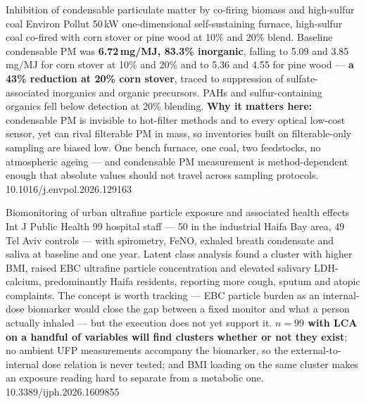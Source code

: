 \documentclass[10pt]{article}
\begin{document}
{Inhibition of condensable particulate matter by co-firing biomass and high-sulfur coal}
{Environ Pollut}
{50\,kW one-dimensional self-sustaining furnace, high-sulfur coal co-fired with corn stover
or pine wood at 10\% and 20\% blend. Baseline condensable PM was \textbf{6.72\,mg/MJ,
83.3\% inorganic}, falling to 5.09 and 3.85\,mg/MJ for corn stover at 10\% and 20\% and to
5.36 and 4.55 for pine wood --- \textbf{a 43\% reduction at 20\% corn stover}, traced to
suppression of sulfate-associated inorganics and organic precursors. PAHs and
sulfur-containing organics fell below detection at 20\% blending.
\textbf{Why it matters here:} condensable PM is invisible to hot-filter methods and to
every optical low-cost sensor, yet can rival filterable PM in mass, so inventories built
on filterable-only sampling are biased low. One bench furnace, one coal, two feedstocks,
no atmospheric ageing --- and condensable PM measurement is method-dependent enough that
absolute values should not travel across sampling protocols.}
{10.1016/j.envpol.2026.129163}



{Biomonitoring of urban ultrafine particle exposure and associated health effects}
{Int J Public Health}
{99 hospital staff --- 50 in the industrial Haifa Bay area, 49 Tel Aviv controls --- with
spirometry, FeNO, exhaled breath condensate and saliva at baseline and one year. Latent
class analysis found a cluster with higher BMI, raised EBC ultrafine particle concentration
and elevated salivary LDH-calcium, predominantly Haifa residents, reporting more cough,
sputum and atopic complaints. The concept is worth tracking --- EBC particle burden as an
internal-dose biomarker would close the gap between a fixed monitor and what a person
actually inhaled --- but the execution does not yet support it. \textbf{$n=99$ with LCA on a
handful of variables will find clusters whether or not they exist}; no ambient UFP
measurements accompany the biomarker, so the external-to-internal dose relation is never
tested; and BMI loading on the same cluster makes an exposure reading hard to separate
from a metabolic one.}
{10.3389/ijph.2026.1609855}
\end{document}
